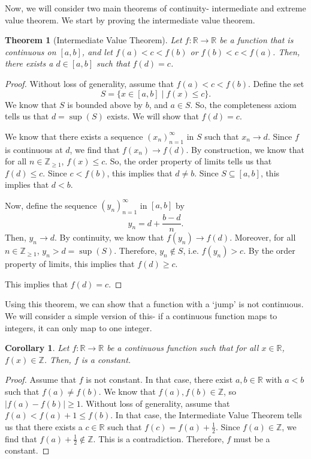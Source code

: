 \documentclass[a4paper, openany]{memoir}
\theoremstyle{definition}
\theoremstyle{plain}
\newtheorem{theorem}[definition]{Theorem}
\newtheorem{corollary}[definition]{Corollary}
\begin{document}
Now, we will consider two main theorems of continuity- intermediate and extreme value theorem. We start by proving the intermediate value theorem.
\begin{theorem}[Intermediate Value Theorem]
Let $f: \mathbb{R} \to \mathbb{R}$ be a function that is continuous on $[a, b]$, and let $f(a) < c < f(b)$ or $f(b) < c < f(a)$. Then, there exists a $d \in [a, b]$ such that $f(d) = c$.
\end{theorem}
\begin{proof}
Without loss of generality, assume that $f(a) < c < f(b)$. Define the set
\[S = \{x \in [a, b] \mid f(x) \leqslant c\}.\]
We know that $S$ is bounded above by $b$, and $a \in S$. So, the completeness axiom tells us that $d = \sup (S)$ exists. We will show that $f(d) = c$.

\noindent We know that there exists a sequence $(x_n)_{n=1}^{\infty}$ in $S$ such that $x_n \to d$. Since $f$ is continuous at $d$, we find that $f(x_n) \to f(d)$. By construction, we know that for all $n \in \mathbb{Z}_{\geqslant 1}$, $f(x) \leqslant c$. So, the order property of limits tells us that $f(d) \leqslant c$. Since $c < f(b)$, this implies that $d \neq b$. Since $S \subseteq [a, b]$, this implies that $d < b$.

\noindent Now, define the sequence $(y_n)_{n=1}^{\infty}$ in $[a, b]$ by
\[y_n = d + \frac{b-d}{n}.\]
Then, $y_n \to d$. By continuity, we know that $f(y_n) \to f(d)$. Moreover, for all $n \in \mathbb{Z}_{\geqslant 1}$, $y_n > d = \sup (S)$. Therefore, $y_n \not\in S$, i.e. $f(y_n) > c$. By the order property of limits, this implies that $f(d) \geqslant c$.

\noindent This implies that $f(d) = c$.
\end{proof}
\noindent Using this theorem, we can show that a function with a `jump' is not continuous. We will consider a simple version of this- if a continuous function maps to integers, it can only map to one integer.
\begin{corollary}
Let $f: \mathbb{R} \to \mathbb{R}$ be a continuous function such that for all $x \in \mathbb{R}$, $f(x) \in \mathbb{Z}$. Then, $f$ is a constant.
\end{corollary}
\begin{proof}
Assume that $f$ is not constant. In that case, there exist $a, b \in \mathbb{R}$ with $a < b$ such that $f(a) \neq f(b)$. We know that $f(a), f(b) \in \mathbb{Z}$, so $|f(a) - f(b)| \geqslant 1$. Without loss of generality, assume that $f(a) < f(a) + 1 \leqslant f(b)$. In that case, the Intermediate Value Theorem tells us that there exists a $c \in \mathbb{R}$ such that $f(c) = f(a) + \frac{1}{2}$. Since $f(a) \in \mathbb{Z}$, we find that $f(a) + \frac{1}{2} \not\in \mathbb{Z}$. This is a contradiction. Therefore, $f$ must be a constant.
\end{proof}
\end{document}
